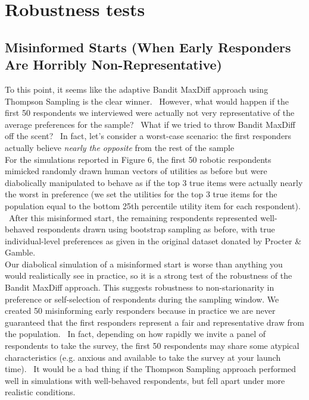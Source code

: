 \documentclass[mksc,blindrev]{informs3} %
\begin{document}
\section{Robustness tests}
\subsection{Misinformed Starts (When Early Responders Are Horribly Non-Representative)}
To this point, it seems like the adaptive Bandit MaxDiff approach using Thompson Sampling is the clear winner.  However, what would happen if the first 50 respondents we interviewed were actually not very representative of the average preferences for the sample?  What if we tried to throw Bandit MaxDiff off the scent?  In fact, let’s consider a worst-case scenario: the first responders actually believe \textit{nearly the opposite} from the rest of the sample\\
For the simulations reported in Figure 6, the first 50 robotic respondents mimicked randomly drawn human vectors of utilities as before but were diabolically manipulated to behave as if the top 3 true items were actually nearly the worst in preference (we set the utilities for the top 3 true items for the population equal to the bottom 25th percentile utility item for each respondent).  After this misinformed start, the remaining respondents represented well-behaved respondents drawn using bootstrap sampling as before, with true individual-level preferences as given in the original dataset donated by Procter \& Gamble.\\
Our diabolical simulation of a misinformed start is worse than anything you would realistically see in practice, so it is a strong test of the robustness of the Bandit MaxDiff approach. This suggests robustness to non-starionarity in preference or self-selection of respondents during the sampling window. We created 50 misinforming early responders because in practice we are never guaranteed that the first responders represent a fair and representative draw from the population.  In fact, depending on how rapidly we invite a panel of respondents to take the survey, the first 50 respondents may share some atypical characteristics (e.g. anxious and available to take the survey at your launch time).  It would be a bad thing if the Thompson Sampling approach performed well in simulations with well-behaved respondents, but fell apart under more realistic conditions. \\
\end{document}
